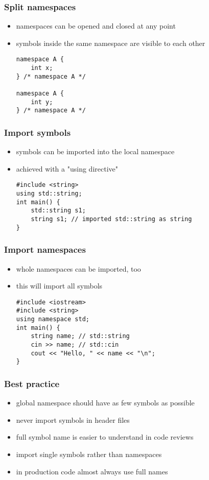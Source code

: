 \begin{frame}[fragile]
    \frametitle{Split namespaces}
    \begin{itemize}
        \item namespaces can be opened and closed at any point
        \item symbols inside the same namespace are visible to each other
        \begin{lstlisting}[numbers=none]
namespace A {
    int x;
} /* namespace A */

namespace A {
    int y;
} /* namespace A */
        \end{lstlisting}
    \end{itemize}
\end{frame}

\begin{frame}[fragile]
    \frametitle{Import symbols}
    \begin{itemize}
        \item symbols can be imported into the local namespace
        \item achieved with a "using directive"
        \begin{lstlisting}
#include <string>
using std::string;
int main() {
    std::string s1;
    string s1; // imported std::string as string
}
        \end{lstlisting}
    \end{itemize}
\end{frame}

\begin{frame}[fragile]
    \frametitle{Import namespaces}
    \begin{itemize}
        \item whole namespaces can be imported, too
        \item this will import all symbols
        \begin{lstlisting}
#include <iostream>
#include <string>
using namespace std;
int main() {
    string name; // std::string
    cin >> name; // std::cin
    cout << "Hello, " << name << "\n";
}
        \end{lstlisting}
    \end{itemize}
\end{frame}

\begin{frame}[fragile]
    \frametitle{Best practice}
    \begin{itemize}
        \item global namespace should have as few symbols as possible
        \item never import symbols in header files
        \item full symbol name is easier to understand in code reviews
        \item import single symbols rather than namespaces
        \item in production code almost always use full names
    \end{itemize}
\end{frame}

